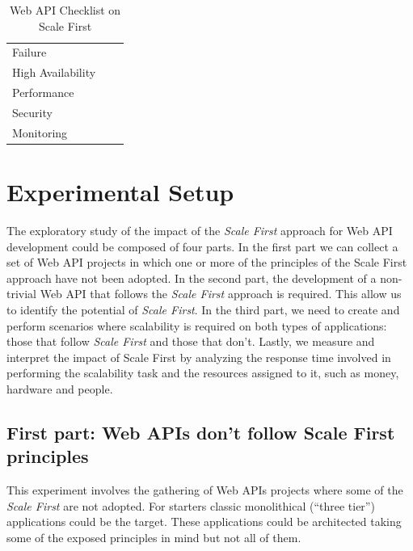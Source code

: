 \documentclass[10pt,article]{IEEEtran}
\begin{document}
\begin{table}[h!]
\begin{tabular}{lc|c}
        \hspace{0.2cm}Failure& & \\
        \hspace{0.2cm}High Availability & & \\
        \hspace{0.2cm}Performance & & \\
        \hspace{0.2cm}Security & & \\
        \hspace{0.2cm}Monitoring & &\\                 
    \bottomrule[1.5pt]
    \end{tabular}
    \caption{Web API Checklist on Scale First}\label{table:checklist}    
\end{table}


\ifCLASSOPTIONcompsoc
\else
    \section{Experimental Setup}
\label{sec:experimentals}
\fi

The exploratory study of the impact of the \textit{Scale First} approach for Web API development could be composed of four parts. In the first part we can collect a set of Web API projects in which one or more of the principles of the Scale First approach have not been adopted. In the second part, the development of a non-trivial Web API that follows the \textit{Scale First} approach is required. This allow us to identify the potential of \textit{Scale First}. In the third part, we need to create and perform scenarios where scalability is required on both types of applications: those that follow \textit{Scale First} and those that don't. Lastly, we measure and interpret the impact of Scale First by analyzing the response time involved in performing the scalability task and the resources assigned to it, such as money, hardware and people.


\subsection{First part: Web APIs don't follow Scale First principles}
This experiment involves the gathering of Web APIs projects where some of the \textit{Scale First} are not adopted. For starters classic monolithical (``three tier'') applications could be the target. These applications could be architected taking some of the exposed principles in mind but not all of them. 
\end{document}
